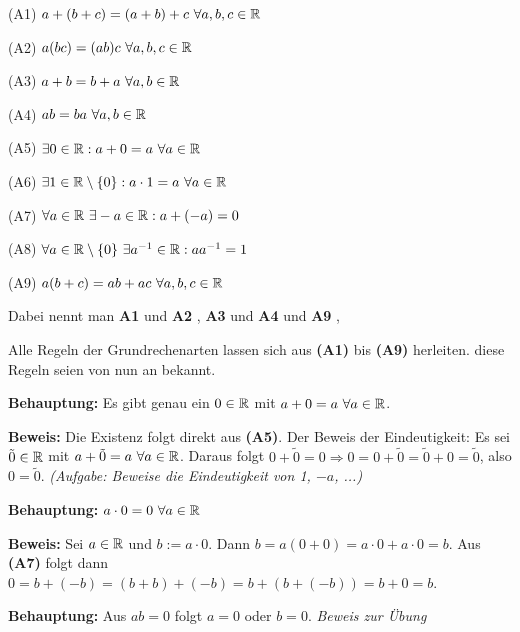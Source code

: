 \documentclass[a4paper,twoside,DIV15,BCOR12mm]{scrbook}
\begin{document}
\begin{axiom}[K"orperaxiome]
\begin{liste}
\item[(A1)] $a+(b+c) = (a+b)+c \ \forall a,b,c \in \MdR$
\item[(A2)] $a(bc) = (ab)c \ \forall a,b,c \in \mathbb{R}$
\item[(A3)] $a+b = b+a \ \forall a,b \in \mathbb{R}$
\item[(A4)] $ab = ba \ \forall a,b \in \mathbb{R}$
\item[(A5)] $\exists 0 \in \mathbb{R}: a + 0 = a \ \forall a \in \mathbb{R}$
\item[(A6)] $\exists 1 \in \mathbb{R}\setminus\{0\}: a \cdot 1 = a \ \forall a \in \mathbb{R}$
\item[(A7)] $\forall a \in \MdR\ \exists -a \in \MdR: a + (-a) = 0 $
\item[(A8)] $\forall a \in \mathbb{R} \setminus \{0\}\ \exists a^{-1} \in \mathbb{R}: a a^{-1} = 1 $
\item[(A9)] $a(b+c) = ab + ac \ \forall a,b,c \in \MdR$
\end{liste}
\end{axiom}

Dabei nennt man \textbf{A1} und \textbf{A2} , \textbf{A3} und \textbf{A4}  und \textbf{A9} , 

Alle Regeln der Grundrechenarten lassen sich aus \textbf{(A1)} bis \textbf{(A9)} herleiten. diese Regeln seien von nun an bekannt.

\begin{beispiele}
\item \textbf{Behauptung:} Es gibt genau ein $0 \in \mathbb{R}$ mit $a+0 = a \ \forall a\in \mathbb{R}$.

\textbf{Beweis:} Die Existenz folgt direkt aus \textbf{(A5)}. Der Beweis der Eindeutigkeit: Es sei $\tilde 0 \in \mathbb{R}$ mit $a+\tilde 0 = a \ \forall a \in \mathbb{R}$. Daraus folgt $0 + \tilde 0 = 0 \Rightarrow 0 = 0 + \tilde 0 = \tilde 0 + 0 = \tilde 0$, also $0 = \tilde 0$. \textit{(Aufgabe: Beweise die Eindeutigkeit von 1, $-a$, ...)}

\item \textbf{Behauptung:} $a \cdot 0 = 0 \ \forall a \in \mathbb{R}$

\textbf{Beweis:} Sei $a\in\mathbb{R}$ und $b := a \cdot 0$. Dann $b = a(0+0) = a \cdot 0 + a \cdot 0 = b$. Aus \textbf{(A7)} folgt dann $0 = b + (-b) = (b+b)+(-b) = b + (b+ (-b)) = b + 0  =b$.

\item

\textbf{Behauptung:} Aus $ab= 0$ folgt $a = 0$ oder $b=0$. \textit{Beweis zur Übung}

\end{beispiele}
\end{document}

